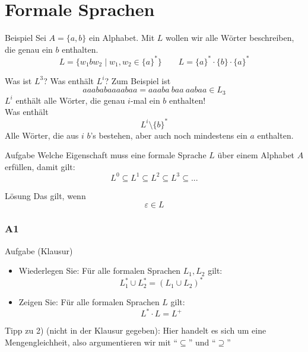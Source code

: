 \section{Formale Sprachen}

\begin{frame}{Beispiel}
	Sei $A = \{a,b\}$ ein Alphabet. Mit $L$ wollen wir alle Wörter beschreiben, die genau ein $b$ enthalten. \\ \pause
	$$ L = \{w_1 b w_2 \mid w_1, w_2 \in \{a\}^\ast \}  \qquad  L = \{a\}^\ast \cdot \{b \} \cdot \{a\}^\ast$$
	
	Was ist $L^3$? Was enthält $L^i$? \pause
	Zum Beispiel ist $$aaababaaaabaa = aaaba \ baa \ aabaa \in L_3$$ \pause
	$L^i$ enthält alle Wörter, die genau $i$-mal ein $b$ enthalten! \\[1em]
	
	Was enthält $$L^i \setminus \{b\}^\ast$$ \pause
	Alle Wörter, die aus $i$ $b$'s bestehen, aber auch noch mindestens ein $a$ enthalten. \\
\end{frame}

\begin{frame}{Aufgabe}
	Welche Eigenschaft muss eine formale Sprache $L$ über einem Alphabet
	$A$ erfüllen, damit gilt: $$ L^0 \subseteq L^1 \subseteq L^2 \subseteq L^3 \subseteq ... $$
	
	\pause
	\begin{block}{Lösung}
		Das gilt, wenn $$ \varepsilon \in L $$
	\end{block}
	
\end{frame}

\subsubsection{A1}
\begin{frame}{Aufgabe (Klausur) }
		\begin{itemize}
			\item Wiederlegen Sie: Für alle formalen Sprachen $L_1 , L_2$ gilt: 
			$$L_1^\ast \cup L_2^\ast = (L_1 \cup L_2 )^\ast$$
			
			\item Zeigen Sie: Für alle formalen Sprachen $L$ gilt: 
				$$L^\ast \cdot L = L^+ $$ 
	\end{itemize}

	Tipp zu 2) (nicht in der Klausur gegeben): Hier handelt es sich um eine Mengengleichheit, also argumentieren wir mit \enquote{$\subseteq$} und \enquote{$\supseteq$}
\end{frame}

